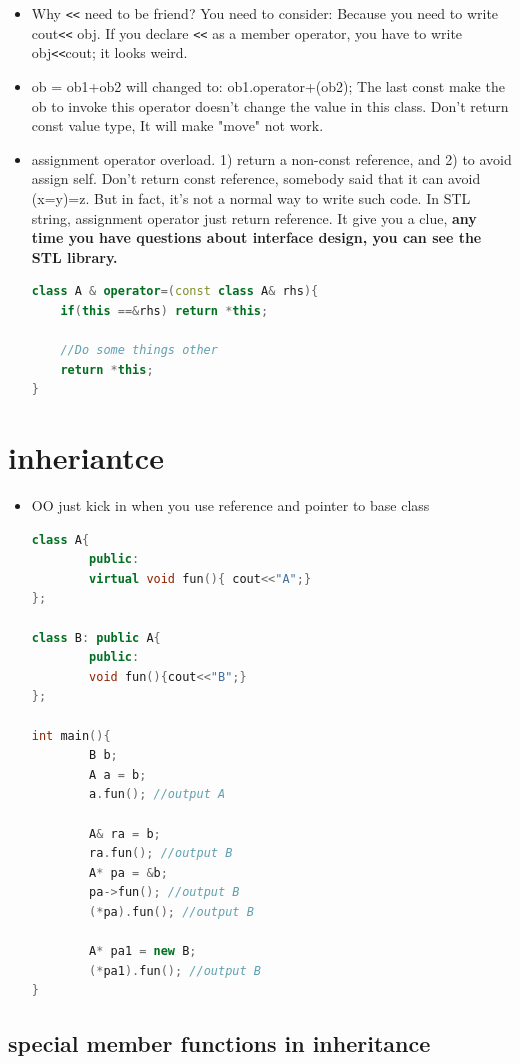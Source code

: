 \documentclass[a4paper,11pt,twoside]{book}
\begin{document}
\begin{itemize}
	\item Why \verb=<<= need to be friend? You need to consider:  Because you need to write cout\verb=<<= obj. If you declare \verb=<<= as a member operator, you have to write obj\verb=<<=cout; it looks weird.
	
	\item ob = ob1+ob2 will changed to:  ob1.operator+(ob2);  The last const make the ob to invoke this operator doesn't change the value in this class. Don't return const value type, It will make "move" not work.
	
	\item assignment operator overload. 1) return a non-const reference, and 2) to avoid assign self. Don't return const reference, somebody said that it can avoid (x=y)=z. But in fact, it's not a normal way to write such code. In STL string, assignment operator just return reference. It give you a clue, \textbf{any time you have questions about interface design, you can see the STL library.}
\begin{lstlisting}[frame=single, language=c++]
class A & operator=(const class A& rhs){
	if(this ==&rhs) return *this;
	
	//Do some things other
	return *this;
}
\end{lstlisting}
	
\end{itemize}


\section{inheriantce}
\begin{itemize}
	\item OO just kick in when you use reference and pointer to base class
\begin{lstlisting}[frame=single, language=c++]
class A{
		public:
		virtual void fun(){ cout<<"A";}
};
	
class B: public A{
		public:
		void fun(){cout<<"B";}
};
	
int main(){
		B b;
		A a = b;
		a.fun(); //output A
		
		A& ra = b;
		ra.fun(); //output B
		A* pa = &b;
		pa->fun(); //output B
		(*pa).fun(); //output B
		
		A* pa1 = new B;
		(*pa1).fun(); //output B
}
\end{lstlisting}
\end{itemize}

\subsection{special member functions in inheritance}
\end{document}
